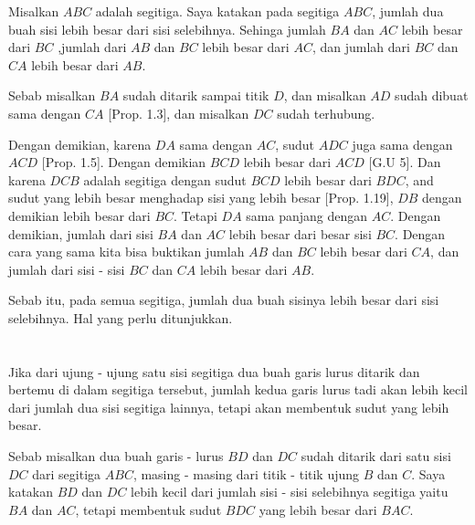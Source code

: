 \documentclass[a4paper]{book}
\begin{document}
Misalkan $ABC$ adalah segitiga. Saya katakan pada segitiga $ABC$, jumlah dua
buah sisi lebih besar dari sisi selebihnya. Sehinga jumlah $BA$ dan $AC$ lebih
besar dari $BC$ ,jumlah dari $AB$ dan $BC$ lebih besar dari $AC$, dan jumlah
dari $BC$ dan $CA$ lebih besar dari $AB$.

Sebab misalkan $BA$ sudah ditarik sampai titik $D$, dan misalkan $AD$ sudah dibuat 
sama dengan $CA$ [Prop. 1.3], dan misalkan $DC$ sudah terhubung.

Dengan demikian, karena $DA$ sama dengan $AC$, sudut $ADC$ juga sama dengan 
$ACD$ [Prop. 1.5]. Dengan demikian $BCD$ lebih besar dari $ACD$ [G.U 5]. 
Dan karena $DCB$ adalah segitiga dengan sudut $BCD$ lebih besar dari $BDC$, 
and sudut yang lebih besar menghadap sisi yang lebih besar [Prop. 1.19], $DB$
dengan demikian lebih besar dari $BC$. Tetapi $DA$ sama panjang dengan $AC$.
Dengan demikian, jumlah dari sisi $BA$ dan $AC$ lebih besar dari besar sisi
$BC$. Dengan cara yang sama kita bisa buktikan jumlah $AB$ dan $BC$ lebih besar
dari $CA$, dan jumlah dari sisi - sisi $BC$ dan $CA$ lebih besar dari $AB$.  

Sebab itu, pada semua segitiga, jumlah dua buah sisinya lebih besar dari sisi 
selebihnya. Hal yang perlu ditunjukkan.  

\section*{\centering \thesection}
Jika dari ujung - ujung satu sisi segitiga dua buah garis lurus ditarik dan 
bertemu di dalam segitiga tersebut, jumlah kedua garis lurus tadi akan lebih
kecil dari jumlah dua sisi segitiga lainnya, tetapi akan membentuk sudut
yang lebih besar.

\begin{center}
\end{center}

Sebab misalkan dua buah garis - lurus $BD$ dan $DC$ sudah ditarik dari
satu sisi $DC$ dari segitiga $ABC$, masing - masing dari titik - titik ujung
$B$ dan $C$. Saya katakan $BD$ dan $DC$ lebih kecil dari jumlah sisi - sisi
selebihnya segitiga yaitu $BA$ dan $AC$, tetapi membentuk sudut 
$BDC$ yang lebih besar  dari $BAC$.
\end{document}
